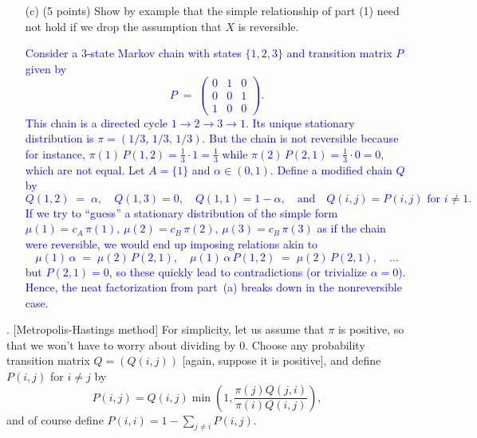 \documentclass{article}
\begin{document}
\begin{itemize}
    \item[(c)] (5 points) Show by example that the simple relationship of part (1) need not hold if we drop the assumption that $X$ is reversible.

    \textcolor{blue}{Consider a 3-state Markov chain with states $\{1,2,3\}$ and transition matrix $P$ given by
\[
  P \;=\;
  \begin{pmatrix}
    0 & 1 & 0 \\
    0 & 0 & 1 \\
    1 & 0 & 0
  \end{pmatrix}.
\]
This chain is a directed cycle $1 \to 2 \to 3 \to 1$. 
Its unique stationary distribution is $\pi = (1/3,\,1/3,\,1/3)$. 
But the chain is not reversible because for instance, $\pi(1)\,P(1,2) = \tfrac13\cdot 1 = \tfrac13$ while $\pi(2)\,P(2,1)=\tfrac13 \cdot 0=0$, which are not equal.
\smallskip
Let $A=\{1\}$ and $\alpha\in(0,1)$. Define a modified chain $Q$ by
\[
  Q(1,2) \;=\; \alpha,\quad Q(1,3)=0,\quad Q(1,1)=1-\alpha,
  \quad
  \text{and}
  \quad
  Q(i,j)=P(i,j) \text{ for }i\neq 1.
\]
If we try to ``guess'' a stationary distribution of the simple form
\(\mu(1)= c_A\,\pi(1),\,\mu(2)=c_B\,\pi(2),\,\mu(3)=c_B\,\pi(3)\)
as if the chain were reversible, we would end up imposing relations akin to
\[
  \mu(1)\,\alpha
  \;=\;
  \mu(2)\,P(2,1),
  \quad
  \mu(1)\,\alpha\,P(1,2)
  \;=\;
  \mu(2)\,P(2,1), 
  \quad
  \ldots
\]
but $P(2,1)=0$, so these quickly lead to contradictions (or trivialize $\alpha=0$). 
Hence, the neat factorization from part~(a) breaks down in the nonreversible case.
}

\end{itemize}

\bigskip

. [Metropolis-Hastings method] For simplicity, let us assume that $\pi$ is positive, so that we won’t have to worry about dividing by 0. Choose any probability transition matrix $Q = (Q(i,j))$ [again, suppose it is positive], and define $P(i,j)$ for $i \neq j$ by
\[
P(i,j) = Q(i,j) \min \left( 1, \frac{\pi(j)Q(j,i)}{\pi(i)Q(i,j)} \right),
\]
and of course define $P(i,i) = 1 - \sum_{j \neq i} P(i,j)$. 
\end{document}
